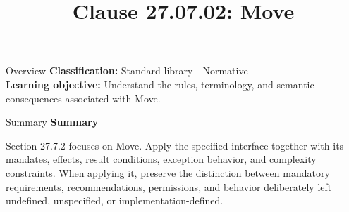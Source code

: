 \documentclass[10pt,letterpaper]{article}
\title{Clause 27.07.02: Move}
\author{}
\date{}
\begin{document}
\maketitle
\begin{CornellOverviewBox}{Overview}
\textbf{Classification:} Standard library - Normative\\[2pt]
\textbf{Learning objective:} Understand the rules, terminology, and semantic consequences associated with Move.
\end{CornellOverviewBox}\begin{CornellSummaryBox}{Summary}
{\sffamily\bfseries\color{Accent} Summary}\par\vspace{3pt}Section 27.7.2 focuses on Move. Apply the specified interface together with its mandates, effects, result conditions, exception behavior, and complexity constraints. When applying it, preserve the distinction between mandatory requirements, recommendations, permissions, and behavior deliberately left undefined, unspecified, or implementation-defined.
\end{CornellSummaryBox}
\end{document}
